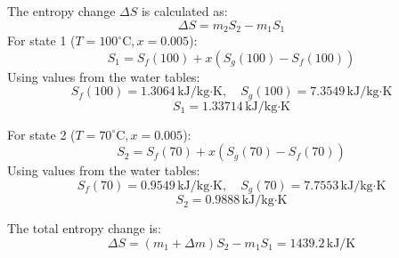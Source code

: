 The entropy change \( \Delta S \) is calculated as:  
\[
\Delta S = m_2 S_2 - m_1 S_1
\]  
For state 1 (\( T = 100^\circ\text{C}, x = 0.005 \)):  
\[
S_1 = S_f(100) + x(S_g(100) - S_f(100))
\]  
Using values from the water tables:  
\[
S_f(100) = 1.3064 \, \text{kJ/kg·K}, \quad S_g(100) = 7.3549 \, \text{kJ/kg·K}
\]  
\[
S_1 = 1.33714 \, \text{kJ/kg·K}
\]  

For state 2 (\( T = 70^\circ\text{C}, x = 0.005 \)):  
\[
S_2 = S_f(70) + x(S_g(70) - S_f(70))
\]  
Using values from the water tables:  
\[
S_f(70) = 0.9549 \, \text{kJ/kg·K}, \quad S_g(70) = 7.7553 \, \text{kJ/kg·K}
\]  
\[
S_2 = 0.9888 \, \text{kJ/kg·K}
\]  

The total entropy change is:  
\[
\Delta S = (m_1 + \Delta m) S_2 - m_1 S_1 = 1439.2 \, \text{kJ/K}
\]